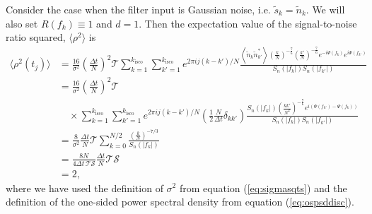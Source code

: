 Consider the case when the filter input is Gaussian noise, i.e. $\tilde{s}_k =
\tilde{n}_k$.  We will also set $R(f_k)\equiv 1$ and $d = 1$.  Then the expectation
value of the signal-to-noise ratio squared, $\langle \rho^2
\rangle$ is
\begin{equation}
\begin{split}
\langle \rho^2(t_j) \rangle &=
\frac{16}{\sigma^2}\left(\frac{\Delta t}{N}\right)^2 \mathcal{T}
  \sum_{k=1}^{k_\mathrm{isco}} \sum_{k'=1}^{k_\mathrm{isco}} 
  e^{2\pi ij(k-k')/N} 
  \frac{\left\langle \tilde{n}_k \tilde{n}_{k'}^{\ast} \right\rangle 
        \left(\frac{k}{N}\right)^{-\frac{7}{6}} \left(\frac{k'}{N}\right)^{-\frac{7}{6}}
        e^{-i\Psi(f_k)} e^{i\Psi(f_{k'})}}
       {S_n\left(\left|f_k\right|\right)S_n\left(\left|f_{k'}\right|\right)} \\
&= 
\frac{16}{\sigma^2}\left(\frac{\Delta t}{N}\right)^2 \mathcal{T} \\
&\quad\times
  \sum_{k=1}^{k_\mathrm{isco}} \sum_{k'=1}^{k_\mathrm{isco}} 
  e^{2\pi ij(k-k')/N} \left(\frac{1}{2} \frac{N}{\Delta t}  \delta_{kk'} \right) 
  \frac{ S_n\left(\left|f_k\right|\right)
        \left(\frac{kk'}{N^2}\right)^{-\frac{7}{6}}
        e^{i ( \Psi(f_{k'}) - \Psi(f_k) )}}
       {S_n\left(\left|f_k\right|\right)S_n\left(\left|f_{k'}\right|\right)} \\
&= 
\frac{8}{\sigma^2} \frac{\Delta t}{N} \mathcal{T}
  \sum_{k=0}^{N/2}
  \frac{ \left(\frac{k}{N}\right)^{-7/3} }
       {S_n\left(\left|f_k\right|\right)} \\
&= 
\frac{8N}{4\Delta t\, \mathcal{T}\mathcal{S}} \frac{\Delta t}{N} \mathcal{T} \mathcal{S} \\
&= 2,
\label{eq:filternorm}
\end{split}
\end{equation}
where we have used the definition of $\sigma^2$ from equation
(\ref{eq:sigmasqts}) and the definition of the one-sided power spectral
density from equation (\ref{eq:ospsddisc}).

